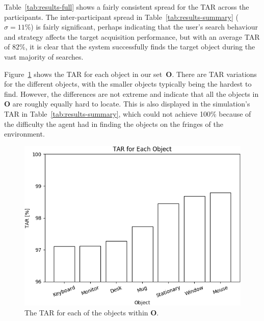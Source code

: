 \documentclass[a4paper, twoside]{article}
\begin{document}

Table~\ref{tab:results-full} shows a fairly consistent spread for the TAR across the participants. The inter-participant spread in Table~\ref{tab:results-summary} ($\sigma=11\%$) is fairly significant, perhaps indicating that the user's search behaviour and strategy affects the target acquisition performance, but with an average TAR of $82\%$, it is clear that the system successfully finds the target object during the vast majority of searches. 

Figure~\ref{fig:tar-objects} shows the TAR for each object in our set~$\mathbf{O}$. There are TAR variations for the different objects, with the smaller objects typically being the hardest to find. However, the differences are not extreme and indicate that all the objects in $\mathbf{O}$ are roughly equally hard to locate. This is also displayed in the simulation's TAR in Table~\ref{tab:results-summary}, which could not achieve 100\% because of the difficulty the agent had in finding the objects on the fringes of the environment. 

\begin{figure}
  \centering
  \includegraphics[width=\columnwidth]{../figures/tar_objects.png}
  \caption{The TAR for each of the objects within $\mathbf{O}$. }\label{fig:tar-objects}
\end{figure}
\end{document}
